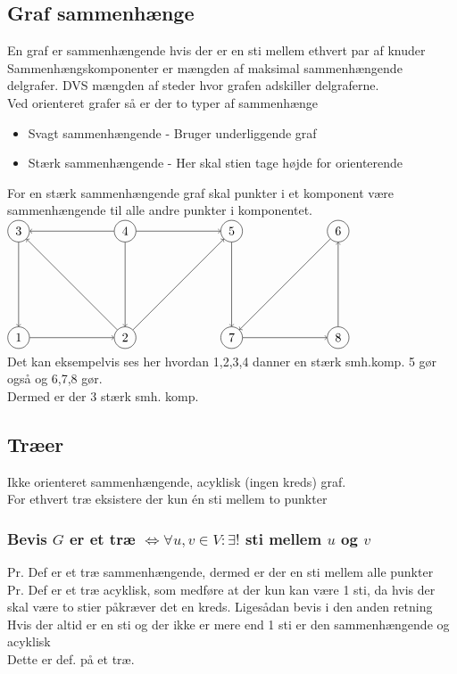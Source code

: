 \documentclass[12pt, a4paper]{article}
\begin{document}
	\subsection{Graf sammenhænge}
		En graf er sammenhængende hvis der er en sti mellem ethvert par af knuder\\
		Sammenhængskomponenter er mængden af maksimal sammenhængende delgrafer. DVS mængden af steder hvor grafen adskiller delgraferne.\\
		Ved orienteret grafer så er der to typer af sammenhænge\\
		\begin{itemize}
			\item Svagt sammenhængende - Bruger underliggende graf
			\item Stærk sammenhængende - Her skal stien tage højde for orienterende
		\end{itemize}
		For en stærk sammenhængende graf skal punkter i et komponent være sammenhængende til alle andre punkter i komponentet.\\
		$\begin{tikzpicture}[scale=3]
			\tikzstyle{vertex}=[circle,draw=black]
			\node[vertex](v1) at (0,0){1};
			\node[vertex](v2) at (1,0){2};
			\node[vertex](v4) at (0,1) {3};
			\node[vertex](v3) at (1,1) {4};
			\node[vertex](v5) at (2,1) {5};
			\node[vertex](v6) at (3,1) {6};
			\node[vertex](v7) at (2,0) {7};
			\node[vertex](v8) at (3,0) {8};
			\path[->]
				(v2) edge node {}(v5)
				(v3) edge node {}(v2)
				(v4) edge node {}(v1)
				(v3) edge node {}(v4)
				(v2) edge node {}(v4)
				(v3) edge node {}(v5)
				(v1) edge node {}(v2)
				(v5) edge node {}(v7)
				(v7) edge node {}(v8)
				(v6) edge node {}(v7)
				(v8) edge node {}(v6);
		\end{tikzpicture}$\\
		Det kan eksempelvis ses her hvordan 1,2,3,4 danner en stærk smh.komp. 5 gør også og 6,7,8 gør.\\
		Dermed er der 3 stærk smh. komp.
	\subsection{Træer}
		Ikke orienteret sammenhængende, acyklisk (ingen kreds) graf.\\
		For ethvert træ eksistere der kun én sti mellem to punkter
		\subsubsection{Bevis $G$ er et træ $\iff \forall u,v \in V: \exists !$ sti mellem $u$ og $v$}
			Pr. Def er et træ sammenhængende, dermed er der en sti mellem alle punkter\\
			Pr. Def er et træ acyklisk, som medføre at der kun kan være 1 sti, da hvis der skal være to stier påkræver det en kreds.
			Ligesådan bevis i den anden retning\\
			Hvis der altid er en sti og der ikke er mere end 1 sti er den sammenhængende og acyklisk\\
			Dette er def. på et træ.
\end{document}
